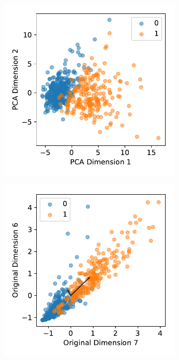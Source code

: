 \documentclass[12pt, a4paper]{scrartcl}
\begin{document}
\begin{figure}
    \centering
    \begin{subfigure}[b]{0.3\textwidth}
        \includegraphics[width=\textwidth]{pca_1}
        \caption{}
        \label{fig:pca1}
    \end{subfigure}
    \begin{subfigure}[b]{0.3\textwidth}
        \includegraphics[width=\textwidth]{pca_3}

\end{subfigure}
\end{figure}
\end{document}
